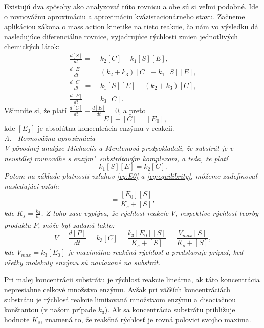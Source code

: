 \documentclass[11pt,final,oneside]{fithesis}
\begin{document}
Existuj\'u dva sp\^ osoby ako analyzova\v t t\'uto rovnicu a obe s\'u si ve\v lmi podobn\'e. Ide o rovnov\'a\v znu aproxim\'aciu a aproxim\'aciu 
kv\'azistacion\'arneho stavu. Za\v cneme aplik\'aciou z\'akona o mass action kinetike na tieto reakcie, \v co n\'am vo v\'ysledku d\'a nasleduj\'uce diferenci\'alne
rovnice, vyjadruj\'uce r\'ychlosti zmien jednotliv\'ych chemick\'ych l\'atok:
\begin{align}
\frac{d[S]}{dt} =& \ k_2[C] - k_1[S][E],\\
\frac{d[E]}{dt} =& \ (k_2 + k_3)[C] - k_1[S][E],\\
\frac{d[C]}{dt} =& \ k_1[S][E] - (k_2 + k_3)[C],\\
\frac{d[P]}{dt} =& \ k_3[C].
\end{align}
V\v simnite si, \v ze plat\'i $\frac{d[C]}{dt} + \frac{d[E]}{dt} = 0$, a preto 
\begin{equation}
\label{eq:E0}
[E] + [C] = [E_0], 
\end{equation}
kde $[E_0]$ je absol\'utna koncentr\'acia enz\'ymu v reakcii. \cite{Keener:1998:MP:Enzymes}\\

\noindent
\it A. \ Rovnov\'a\v zna aproxim\'acia\rm
\\

V p\^ ovodnej anal\'yze Michaelis a Mentenov\'a predpokladali, \v ze substr\'at je v neust\'alej rovnov\'ahe s enz\'ym"~substr\'atov\'ym komplexom, 
a teda, \v ze plat\'i 
\begin{equation}
\label{eq:equilibrity}
k_1[S][E] = k_2[C].
\end{equation}
Potom na z\'aklade platnosti vz\v tahov \ref{eq:E0} a \ref{eq:equilibrity}, m\^ o\v zeme zadefinova\v t nasleduj\'uci vz\v tah:
\begin{equation}
[C] = \frac{[E_0][S]}{K_s + [S]},
\end{equation}
kde $K_s = \frac{k_2}{k_1}$. Z toho zase vypl\'yva, \v ze r\'ychlos\v t reakcie $V$, respekt\'ive r\'ychlos\v t tvorby produktu $P$, m\^ o\v ze by\v t 
zadan\'a takto:
\begin{equation}
\label{eq:ks}
V = \frac{d[P]}{dt} = k_3[C] = \frac{k_3[E_0][S]}{K_s + [S]} = \frac{V_{max}[S]}{K_s + [S]},
\end{equation}
kde $V_{max} = k_3[E_0]$ je maxim\'alna reak\v cn\'a r\'ychlos\v t a predstavuje pr\'ipad, ke\v d v\v setky molekuly enz\'ymu s\'u naviazan\'e na substr\'at.

Pri malej koncentr\'acii substr\'atu je r\'ychlos\v t reakcie line\'arna, ak t\'ato koncentr\'acia nepresiahne celkov\'e mno\v zstvo enz\'ymu. Av\v sak pri
v\"a\v c\v s\'ich koncentr\'aci\'ach substr\'atu je r\'ychlos\v t reakcie limitovan\'a mno\v zstvom enz\'ymu a disocia\v cnou kon\v stantou 
(v na\v som pr\'ipade $k_3$). Ak sa koncentr\'acia substr\'atu pribli\v zuje hodnote $K_s$, znamen\'a to, \v ze reak\v cn\'a r\'ychlos\v t je rovn\'a 
polovici svojho maxima.
\end{document}
